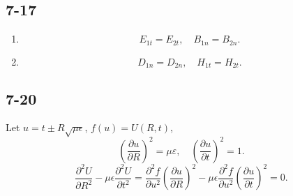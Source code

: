 \documentclass[11pt,a4paper]{article}
\begin{document}
\subsection{7-17}
\begin{enumerate}[label=\alph*)]
\item
$$E_{1t}=E_{2t},\quad B_{1n}=B_{2n}.$$
\item
$$D_{1n}=D_{2n},\quad H_{1t}=H_{2t}.$$
\end{enumerate}

\subsection{7-20}
Let $u=t\pm R\sqrt{\mu\epsilon}$, $f(u)=U(R,t)$,
$$\left(\frac{\partial u}{\partial R}\right)^2=\mu\varepsilon,\quad \left(\frac{\partial u}{\partial t}\right)^2=1.$$
$$\frac{\partial^2 U}{\partial R^2}-\mu\epsilon\frac{\partial^2 U}{\partial t^2}=\frac{\partial^2 f}{\partial u^2}\left(\frac{\partial u}{\partial R}\right)^2-\mu\epsilon\frac{\partial^2 f}{\partial u^2}\left(\frac{\partial u}{\partial t}\right)^2=0.$$
\end{document}
